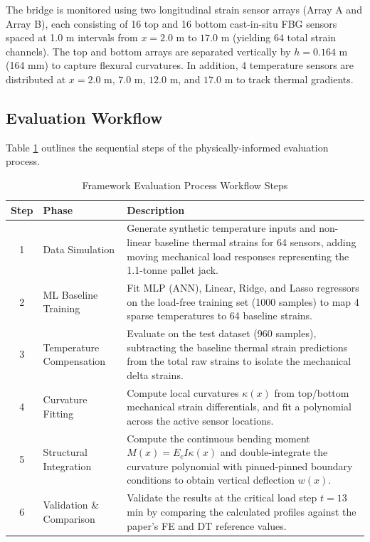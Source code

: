 \documentclass[11pt,journal,onecolumn]{IEEEtran}
\begin{document}
The bridge is monitored using two longitudinal strain sensor arrays (Array A and Array B), each consisting of 16 top and 16 bottom cast-in-situ FBG sensors spaced at 1.0 m intervals from $x = 2.0$ m to $17.0$ m (yielding 64 total strain channels). The top and bottom arrays are separated vertically by $h = 0.164$ m (164 mm) to capture flexural curvatures. In addition, 4 temperature sensors are distributed at $x = 2.0$ m, $7.0$ m, $12.0$ m, and $17.0$ m to track thermal gradients.

\subsection{Evaluation Workflow}
Table \ref{tab:workflow} outlines the sequential steps of the physically-informed evaluation process.

\begin{table}[htbp]
\centering
\caption{Framework Evaluation Process Workflow Steps}
\label{tab:workflow}
\begin{tabular}{clp{9.0cm}}
\toprule
\textbf{Step} & \textbf{Phase} & \textbf{Description} \\
\midrule
1 & Data Simulation & Generate synthetic temperature inputs and non-linear baseline thermal strains for 64 sensors, adding moving mechanical load responses representing the 1.1-tonne pallet jack. \\
2 & ML Baseline Training & Fit MLP (ANN), Linear, Ridge, and Lasso regressors on the load-free training set (1000 samples) to map 4 sparse temperatures to 64 baseline strains. \\
3 & Temperature Compensation & Evaluate on the test dataset (960 samples), subtracting the baseline thermal strain predictions from the total raw strains to isolate the mechanical delta strains. \\
4 & Curvature Fitting & Compute local curvatures $\kappa(x)$ from top/bottom mechanical strain differentials, and fit a polynomial across the active sensor locations. \\
5 & Structural Integration & Compute the continuous bending moment $M(x) = E_c I \kappa(x)$ and double-integrate the curvature polynomial with pinned-pinned boundary conditions to obtain vertical deflection $w(x)$. \\
6 & Validation \& Comparison & Validate the results at the critical load step $t = 13$ min by comparing the calculated profiles against the paper's FE and DT reference values. \\
\bottomrule
\end{tabular}
\end{table}
\end{document}
